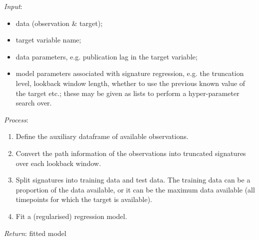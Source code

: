 \documentclass[a4paper, 12pt]{article}
\theoremstyle{remark}
\begin{document}
\begin{algorithm}[h!]
\SetAlgoLined
\textit{Input}:
\begin{itemize}
    \item data (observation \& target);
    \item target variable name;
    \item data parameters, e.g. publication lag in the target variable;
    \item model parameters associated with signature regression, e.g. the truncation level, lookback window length, whether to use the previous known value of the target etc.; these may be given as lists to perform a hyper-parameter search over.
\end{itemize}

\textit{Process}:
\begin{enumerate}
    \item Define the auxiliary dataframe of available observations.
    \item Convert the path information of the observations into truncated signatures over each lookback window.
    \item Split signatures into training data and test data. The training data can be a proportion of the data available, or it can be the maximum data available (all timepoints for which the target is available).
    \item Fit a (regularised) regression model.
\end{enumerate}
\textit{Return}: fitted model

\caption{Fit signature regression model}\label{alg:sigreg_sub}
\end{algorithm}
\end{document}
